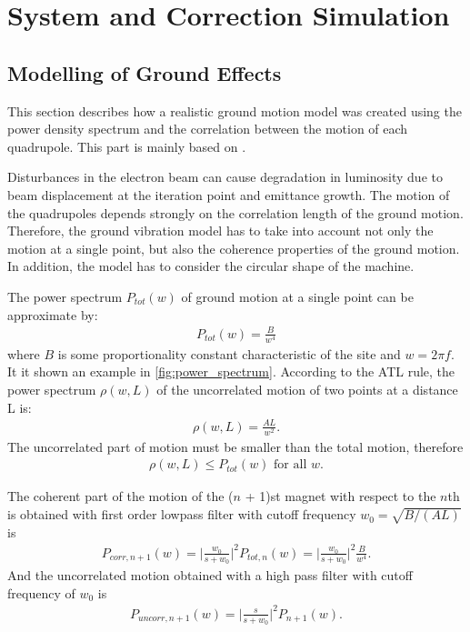 \section{System and Correction Simulation}

\subsection{Modelling of Ground Effects}

This section describes how a realistic ground motion model was created using the power density spectrum and the correlation between the motion of each quadrupole. This part is mainly based on \cite{montag1999simulation}.

Disturbances in the electron beam can cause degradation in luminosity due to beam displacement at the iteration point and emittance growth. The motion of the quadrupoles depends strongly on the correlation length of the ground motion. Therefore, the ground vibration model has to take into account not only the motion at a single point, but also the coherence properties of the ground motion. In addition, the model has to consider the circular shape of the machine.

The power spectrum $P_{tot}(w)$ of ground motion at a single point can be approximate by:
\begin{align} 
    P_{tot}(w) = \frac{B}{w^4}
\end{align}
where $B$ is some proportionality constant characteristic of the site and $w = 2 \pi f$. It it shown an example in \ref{fig:power_spectrum}. According to the ATL rule, the power spectrum $\rho(w, L)$ of the uncorrelated motion of two points at a distance L is:
\begin{align} 
    \rho(w, L) = \frac{A L}{w^2}.
\end{align}
The uncorrelated part of motion must be smaller than the total motion, therefore
\begin{align} 
    \rho(w, L) \leq P_{tot}(w) \textrm{ for all } w.
\end{align} 

The coherent part of the motion of the ($n$ + 1)st magnet with respect to the $n$th is obtained with first order lowpass filter with cutoff frequency $w_0 = \sqrt{B/(A L)}$ is
\begin{align} 
    P_{corr, n+1}(w) = \bigg | \frac{w_0}{s + w_0} \bigg | ^2 P_{tot, n}(w) = \bigg | \frac{w_0}{s + w_0} \bigg | ^2 \frac{B}{w^4}.
\end{align}
And the uncorrelated motion obtained with a high pass filter with cutoff frequency of $w_0$ is
\begin{align} 
    P_{uncorr, n+1}(w) = \bigg | \frac{s}{s + w_0} \bigg | ^2 P_{n+1}(w).
\end{align}

